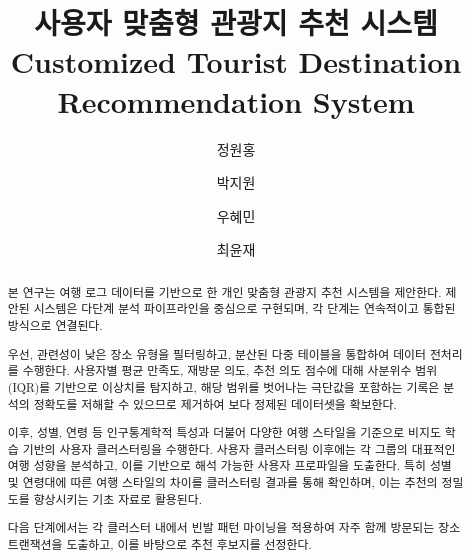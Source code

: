 \documentclass[sigconf]{acmart}
\begin{document}
\begin{CJK}{UTF8}{mj}


\renewcommand\footnotetextcopyrightpermission[1]{} 
\acmISBN{}
\acmDOI{}

\title{사용자 맞춤형 관광지 추천 시스템\\[0.5em]
Customized Tourist Destination Recommendation System}

\author{정원홍}

\author{박지원}

\author{우혜민}

\author{최윤재}


\begin{abstract}

본 연구는 여행 로그 데이터를 기반으로 한 개인 맞춤형 관광지 추천 시스템을 제안한다. 제안된 시스템은 다단계 분석 파이프라인을 중심으로 구현되며, 각 단계는 연속적이고 통합된 방식으로 연결된다.

우선, 관련성이 낮은 장소 유형을 필터링하고, 분산된 다중 테이블을 통합하여 데이터 전처리를 수행한다. 사용자별 평균 만족도, 재방문 의도, 추천 의도 점수에 대해 사분위수 범위(IQR)를 기반으로 이상치를 탐지하고, 해당 범위를 벗어나는 극단값을 포함하는 기록은 분석의 정확도를 저해할 수 있으므로 제거하여 보다 정제된 데이터셋을 확보한다.

이후, 성별, 연령 등 인구통계학적 특성과 더불어 다양한 여행 스타일을 기준으로 비지도 학습 기반의 사용자 클러스터링을 수행한다. 사용자 클러스터링 이후에는 각 그룹의 대표적인 여행 성향을 분석하고, 이를 기반으로 해석 가능한 사용자 프로파일을 도출한다. 특히 성별 및 연령대에 따른 여행 스타일의 차이를 클러스터링 결과를 통해 확인하며, 이는 추천의 정밀도를 향상시키는 기초 자료로 활용된다.

다음 단계에서는 각 클러스터 내에서 빈발 패턴 마이닝을 적용하여 자주 함께 방문되는 장소 트랜잭션을 도출하고, 이를 바탕으로 추천 후보지를 선정한다. 


\end{abstract}
\end{CJK}
\end{document}
